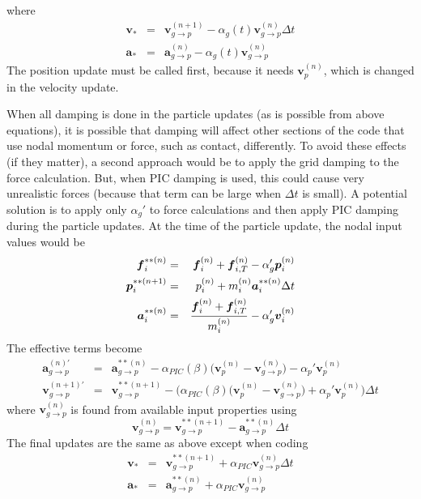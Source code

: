 \documentclass[11pt]{article}
\renewcommand{\vec}[1]{\boldsymbol{#1}}
\begin{document}
where
\begin{eqnarray}
   \vec{v}_*& = & \vec v_{g\to p}^{(n+1)} -  \alpha_g(t)\vec{v}_{g\to p}^{(n)}\Delta t   \\
   \vec{a}_* & = & \vec{a}_{g\to p}^{(n)} -  \alpha_g(t)\vec{v}_{g\to p}^{(n)} 
\end{eqnarray}
The position update must be called first, because it needs $\vec{v}_p^{(n)}$, which is changed in the velocity update.

When all damping is done in the particle updates (as is possible from above equations), it is possible that damping will affect other sections of the code that use nodal momentum or force, such as contact, differently. To avoid these effects (if they matter), a second approach would be to apply the grid damping to the force calculation. But, when PIC damping is used, this could cause very unrealistic forces (because that term can be large when $\Delta t$ is small). A potential solution is to apply only $\alpha_g'$ to force calculations and then apply PIC damping during the particle updates. At the time of the particle update, the nodal input values would be
\begin{eqnarray}
    \vec f_i^{**(n)} & = & \vec f_{i}^{(n)} + \vec f_{i,T}^{(n)} - \alpha_g'\vec p_i^{(n)} \\
    \vec p_i^{**(n+1)} & = &  p_i^{(n)} +  m_i^{(n)}\vec a_i^{**(n)}\Delta t \\
    \vec a_i^{**(n)} & = & { \vec f_{i}^{(n)} + \vec f_{i,T}^{(n)} \over m_i^{(n)}} -  \alpha_g'\vec v_i^{(n)}
\end{eqnarray}
The effective terms become
\begin{eqnarray}
    \vec{a}_{g\to p}^{(n)'} & = &  \vec{a}_{g\to p}^{**(n)} - \alpha_{PIC}(\beta)\bigl(\vec v_p^{(n)}-\vec v_{g\to p}^{(n)}\bigr) -   \alpha_p'\vec{v}_p^{(n)} \\
    \vec v_{g\to p}^{(n+1)'} & = & \vec v_{g\to p}^{**(n+1)} - \biggl(\alpha_{PIC}(\beta)\bigl(\vec v_p^{(n)}-\vec v_{g\to p}^{(n)}\bigr)  + \alpha_p'\vec{v}_p^{(n)}\biggr)\Delta t 
\end{eqnarray}
where $\vec v_{g\to p}^{(n)}$ is found from available input properties using
\begin{equation}
 \vec v_{g\to p}^{(n)}  =  \vec v_{g\to p}^{**(n+1)}  - \vec{a}_{g\to p}^{**(n)}\Delta t
\end{equation}
The final updates are the same as above except when coding
\begin{eqnarray}
   \vec{v}_*& = & \vec v_{g\to p}^{**(n+1)} +  \alpha_{PIC}\vec{v}_{g\to p}^{(n)}\Delta t   \\
   \vec{a}_* & = & \vec{a}_{g\to p}^{**(n)} + \alpha_{PIC}\vec{v}_{g\to p}^{(n)} 
\end{eqnarray}
\end{document}
